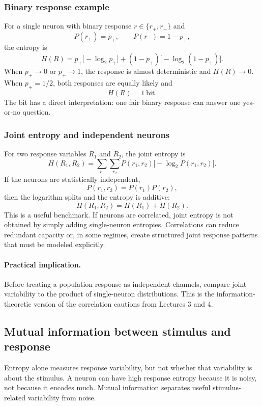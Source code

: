 \subsubsection{Binary response example}

For a single neuron with binary response $r\in\{r_+,r_-\}$ and
\[
    P(r_+)=p_+,\qquad P(r_-)=1-p_+,
\]
the entropy is
\[
    H(R)
    =
    p_+\bigl[-\log_2 p_+\bigr]
    +(1-p_+)\bigl[-\log_2(1-p_+)\bigr].
\]
When $p_+\to 0$ or $p_+\to 1$, the response is almost deterministic and $H(R)\to 0$. When $p_+=1/2$, both responses are equally likely and
\[
    H(R)=1\ \mathrm{bit}.
\]
The bit has a direct interpretation: one fair binary response can answer one yes-or-no question.

\subsubsection{Joint entropy and independent neurons}

For two response variables $R_1$ and $R_2$, the joint entropy is
\[
    H(R_1,R_2)
    =
    \sum_{r_1}\sum_{r_2}
    P(r_1,r_2)\bigl[-\log_2 P(r_1,r_2)\bigr].
\]
If the neurons are statistically independent,
\[
    P(r_1,r_2)=P(r_1)P(r_2),
\]
then the logarithm splits and the entropy is additive:
\[
    H(R_1,R_2)=H(R_1)+H(R_2).
\]
This is a useful benchmark. If neurons are correlated, joint entropy is not obtained by simply adding single-neuron entropies. Correlations can reduce redundant capacity or, in some regimes, create structured joint response patterns that must be modeled explicitly.

\paragraph{Practical implication.}
Before treating a population response as independent channels, compare joint variability to the product of single-neuron distributions. This is the information-theoretic version of the correlation cautions from Lectures 3 and 4.

\subsection{Mutual information between stimulus and response}

Entropy alone measures response variability, but not whether that variability is about the stimulus. A neuron can have high response entropy because it is noisy, not because it encodes much. Mutual information separates useful stimulus-related variability from noise.

